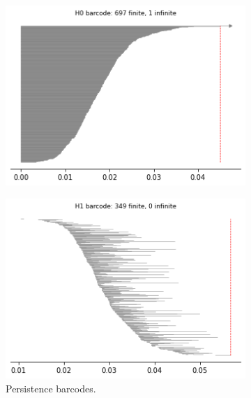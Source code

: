 \begin{figure}[H]
\begin{subfigure}[b]{0.25\textwidth}
\end{subfigure}
\begin{subfigure}[b]{0.24\textwidth}
    \includegraphics[width=\textwidth]{figures/topology/dsphere_H0_barcode.png}
    \caption{}
\end{subfigure}
\begin{subfigure}[b]{0.24\textwidth}
    \includegraphics[width=\textwidth]{figures/topology/dsphere_H1_barcode.png}
        \caption{Persistence barcodes.}
\end{subfigure}
\begin{subfigure}[b]{0.24\textwidth}

\end{subfigure}
\end{figure}
